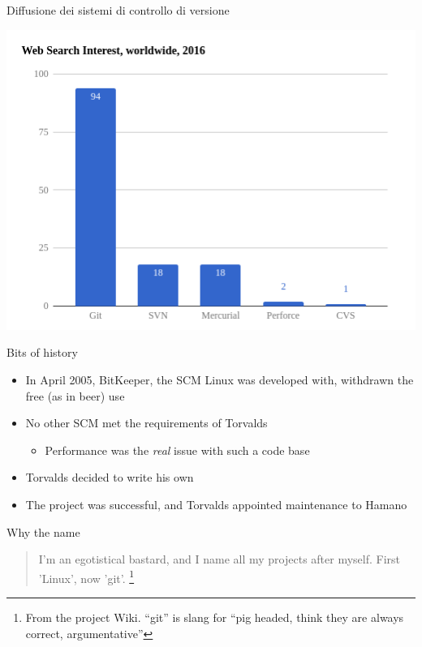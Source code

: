 \documentclass[presentation]{beamer}
\begin{document}
\begin{frame}[allowframebreaks]{Diffusione dei sistemi di controllo di versione}
\begin{center}
        \includegraphics[width=\textwidth, height=.77\textheight, keepaspectratio]{img/search} \\
    \end{center}
\end{frame}

\begin{frame}[fragile]{Bits of history}
	\begin{itemize}
		\item In April 2005, BitKeeper, the SCM Linux was developed with, withdrawn the free (as in 
beer) use
		\item No other SCM met the requirements of Torvalds
		\begin{itemize}
			\item Performance was the \textit{real} issue with such a code base
		\end{itemize}
		\item Torvalds decided to write his own
		\item The project was successful, and Torvalds appointed maintenance to Hamano
	\end{itemize}
	\begin{block}{Why the name}
		\begin{quote}
			I'm an egotistical bastard, and I name all my projects after myself. First 'Linux', now 
'git'. \footnote{\tiny{From the project Wiki. ``git'' is slang for ``pig headed, think they are 
always correct, argumentative''}}
			\begin{flushright}
			\end{flushright}
		\end{quote}
	\end{block}
\end{frame}
\end{document}
